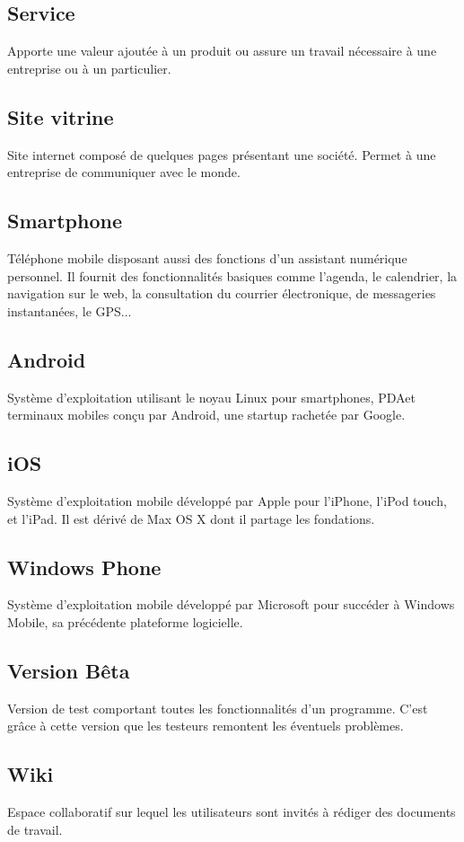 \documentclass{life-fr}
\begin{document}
\subsection{ Service}
Apporte une valeur ajoutée à un produit ou assure un travail nécessaire à une entreprise ou à un particulier.

\subsection{ Site vitrine}
Site internet composé de quelques pages présentant une société. Permet à une entreprise de communiquer avec le monde.

\subsection{ Smartphone}
Téléphone mobile disposant aussi des fonctions d'un assistant numérique personnel. Il fournit des fonctionnalités basiques comme l'agenda, le calendrier, la navigation sur le web, la consultation du courrier électronique, de messageries instantanées, le GPS...

\subsection{ Android}
Système d’exploitation utilisant le noyau Linux pour smartphones, PDAet terminaux mobiles conçu par Android, une startup rachetée par Google.

\subsection{ iOS}
Système d’exploitation mobile développé par Apple pour l'iPhone, l'iPod touch, et l'iPad. Il est dérivé de Max OS X dont il partage les fondations.

\subsection{ Windows Phone}
Système d’exploitation mobile développé par Microsoft pour succéder à Windows Mobile, sa précédente plateforme logicielle.

\subsection{ Version Bêta}
Version de test comportant toutes les fonctionnalités d'un programme. C'est grâce à cette version que les testeurs remontent les éventuels problèmes.

\subsection{ Wiki}
Espace collaboratif sur lequel les utilisateurs sont invités à rédiger des documents de travail.
\end{document}
